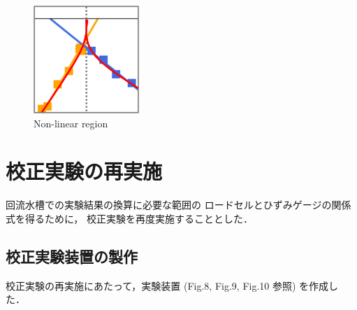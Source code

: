 \documentclass[twocolumn,a4j]{jsarticle}
\begin{document}
\begin{figure}[htbp]
    \footnotesize
    \begin{center}
        \includegraphics[width=40mm]{../images/image_10.png}
        \caption{Non-linear region}
    \end{center}
\end{figure}

\newpage
\section{校正実験の再実施}
回流水槽での実験結果の換算に必要な範囲の
ロードセルとひずみゲージの関係式を得るために，
校正実験を再度実施することとした．

\subsection{校正実験装置の製作}

校正実験の再実施にあたって，実験装置 (Fig.8, Fig.9, Fig.10 参照) を作成した．
\end{document}
